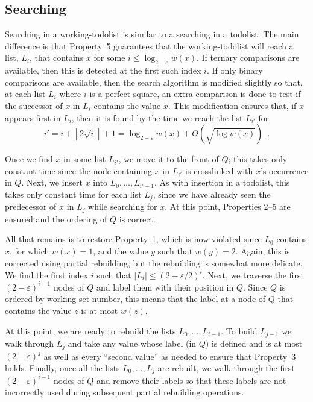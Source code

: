 \documentclass{patmorin}
\newcommand{\eps}{\varepsilon}
\begin{document}
\subsection{Searching}

Searching in a working-todolist is similar to a searching in a todolist.
The main
difference is that Property~5 guarantees that the working-todolist will reach
a list, $L_i$, that contains $x$ for some $i\le\log_{2-\eps} w(x)$.
If ternary comparisons are available, then this is detected at the
first such index $i$.  If only binary comparisons are available, then
the search algorithm is modified slightly so that, at each list $L_i$
where $i$ is a perfect square, an extra comparison is done to test if
the successor of $x$ in $L_i$ contains the value $x$.  This modification
ensures that, if $x$ appears first in $L_i$, then it is found by the
time we reach the list $L_{i'}$ for
\[
     i'=i+\left\lceil 2\sqrt{i}\right\rceil + 1 = \log_{2-\eps} w(x) + O(\sqrt{\log w(x)}) \enspace .
\]

Once we find $x$ in some list $L_{i'}$, we move it to the front of $Q$;
this takes only constant time since the node containing $x$ in $L_{i'}$
is crosslinked with $x$'s occurrence in $Q$.  Next, we insert $x$ into
$L_0,\ldots,L_{i'-1}$.  As with insertion in a todolist, this takes only
constant time for each list $L_j$, since we have already seen the predecessor
of $x$ in $L_j$ while searching for $x$.  
At this point, Properties 2--5 are ensured and the ordering of $Q$ is
correct.  

All that remains is to restore Property~1, which is now violated
since $L_0$ contains $x$, for which $w(x)=1$, and the value $y$ such
that $w(y)=2$.  Again, this is corrected using partial rebuilding,
but the rebuilding is somewhat more delicate.  We find the first index
$i$ such that $|L_i|\le (2-\eps/2)^i$.  Next, we traverse the first
$(2-\eps)^{i-1}$ nodes of $Q$ and label them with their position in $Q$.
Since $Q$ is ordered by working-set number, this means that the label
at a node of $Q$ that contains the value $z$ is at most $w(z)$.

At this point, we are ready to rebuild the lists $L_0,\ldots,L_{i-1}$. To
build $L_{j-1}$ we walk through $L_j$ and take any value whose label
(in $Q$) is defined and is at most $(2-\eps)^j$ as well as every
``second value'' as needed to ensure that Property~3 holds.  Finally,
once all the lists $L_0,\ldots,L_j$ are rebuilt, we walk through the first
$(2-\eps)^{i-1}$ nodes of $Q$ and remove their labels so that these labels
are not incorrectly used during subsequent partial rebuilding operations.
\end{document}
